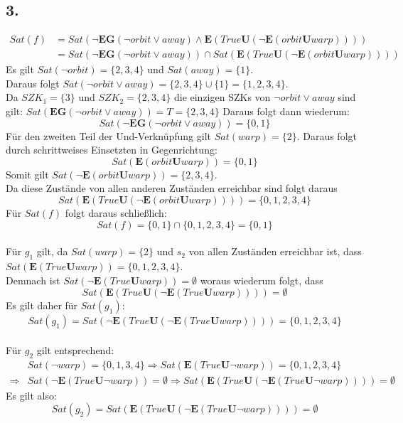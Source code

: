 \documentclass[12pt, paper=a4]{article}
\begin{document}
\subsection*{3.}
\begin{align*}
Sat(f) &= Sat(\neg \mathbf{EG}(\neg orbit\lor away)\land \mathbf{E}(True\mathbf{U}(\neg \mathbf{E}(orbit\mathbf{U}warp)))) \\ &= Sat(\neg \mathbf{EG}(\neg orbit\lor away)) \cap Sat(\mathbf{E}(True\mathbf{U}(\neg \mathbf{E}(orbit\mathbf{U}warp))))
\end{align*}
Es gilt $Sat(\neg orbit)=\{2,3,4\}$ und $Sat(away)=\{1\}$.\\
Daraus folgt $Sat(\neg orbit \lor away)=\{2,3,4\} \cup \{1\} = \{1,2,3,4\}$.\\
Da $SZK_{1}=\{3\}$ und $SZK_{2}= \{2,3,4\}$ die einzigen SZKs von $\neg orbit \lor away$ sind gilt: $Sat( \mathbf{EG}(\neg orbit\lor away))=T=\{2,3,4\}$
Daraus folgt dann wiederum: \[Sat(\neg \mathbf{EG}(\neg orbit\lor away))=\{0,1\}  \]
Für den zweiten Teil der Und-Verknüpfung gilt $Sat(warp)=\{2\}$. Daraus folgt durch schrittweises Einsetzten in Gegenrichtung:\[ Sat(\mathbf{E}(orbit\mathbf{U}warp))=\{0,1\} \]
Somit gilt $Sat(\neg \mathbf{E}(orbit\mathbf{U}warp))=\{2,3,4\}$. \\
Da diese Zustände von allen anderen Zuständen erreichbar sind folgt daraus \[Sat(\mathbf{E}(True\mathbf{U}(\neg \mathbf{E}(orbit\mathbf{U}warp))))=\{0,1,2,3,4\}  \]
Für $Sat(f)$ folgt daraus schließlich:\[ Sat(f)= \{0,1\} \cap \{0,1,2,3,4\} = \{0,1\} \]
\\

Für $g_{1}$ gilt, da $Sat(warp)=\{2\}$ und $s_{2}$ von allen Zuständen erreichbar ist, dass $Sat(\mathbf{E}(True\mathbf{U}warp))=\{0,1,2,3,4\}$.\\
Demnach ist $Sat(\neg\mathbf{E}(True\mathbf{U}warp))=\emptyset$ woraus wiederum folgt, dass \[Sat(\mathbf{E}(True\mathbf{U}(\neg\mathbf{E}(True\mathbf{U}warp))))=\emptyset\]
Es gilt daher für $Sat(g_{1})$:\[Sat(g_{1})=Sat(\neg\mathbf{E}(True\mathbf{U}(\neg\mathbf{E}(True\mathbf{U}warp))))=\{0,1,2,3,4\}\]
\\
Für $g_{2}$ gilt entsprechend:
\begin{align*}
&Sat(\neg warp)=\{0,1,3,4\} \Rightarrow Sat(\mathbf{E}(True\mathbf{U}\neg warp))=\{0,1,2,3,4\} \\
	\Rightarrow& Sat(\neg\mathbf{E}(True\mathbf{U}\neg warp))=\emptyset \Rightarrow Sat(\mathbf{E}(True\mathbf{U}(\neg \mathbf{E}(True\mathbf{U}\neg warp))))=\emptyset
\end{align*}
Es gilt also: \[Sat(g_{2})=Sat(\mathbf{E}(True\mathbf{U}(\neg \mathbf{E}(True\mathbf{U}\neg warp))))=\emptyset\]
\end{document}
